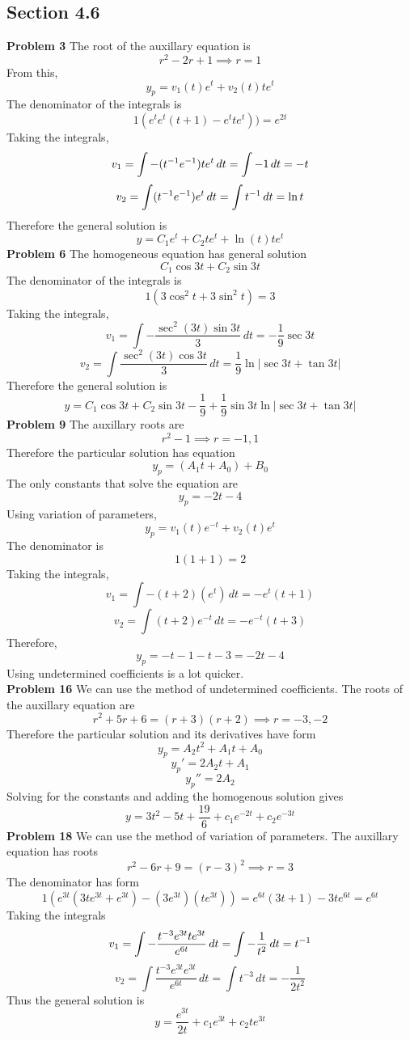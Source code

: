 \subsection*{Section 4.6}
\textbf{Problem 3}
The root of the auxillary equation is 
\[
    r^2-2r+1 \implies r = 1
\]
From this,
\[
    y_p = v_1(t)e^t + v_2(t)te^t
\]
The denominator of the integrals is
\[
    1(e^te^t(t+1) - e^tte^t)) = e^{2t}
\]
Taking the integrals,
\[
    v_1 
    = \int -(t^{-1} e^{-1})te^t \,dt
    = \int -1 \,dt
    = -t
\]
\[
    v_2
    = \int (t^{-1} e^{-1})e^t \,dt
    = \int t^{-1} \,dt
    = \ln t
\]
Therefore the general solution is 
\[
    y = C_1e^t + C_2te^t + \ln (t) te^t
\]
\textbf{Problem 6}
The homogeneous equation has general solution 
\[
    C_1\cos 3t + C_2\sin 3t
\]
The denominator of the integrals is 
\[
    1(3\cos^2t + 3\sin^2t) = 3
\]
Taking the integrals,
\[
    v_1
    = \int -\frac{\sec^2 (3t)\sin 3t}{3} \,dt
    = -\frac{1}{9} \sec 3t
\]
\[
    v_2 
    = \int \frac{\sec^2 (3t)\cos 3t}{3} \,dt
    = \frac{1}{9} \ln |\sec 3t + \tan 3t|
\]
Therefore the general solution is 
\[
    y = C_1\cos 3t + C_2\sin 3t - \frac{1}{9} + \frac{1}{9} \sin 3t \ln |\sec 3t + \tan 3t|
\]
\textbf{Problem 9}
The auxillary roots are 
\[
    r^2 - 1 \implies r = -1, 1
\]
Therefore the particular solution has equation 
\[
    y_p = (A_1t + A_0) + B_0
\]
The only constants that solve the equation are 
\[
    y_p = -2t-4
\]
Using variation of parameters,
\[
    y_p = v_1(t)e^{-t} + v_2(t)e^t
\]
The denominator is
\[
    1(1+1) = 2
\]
Taking the integrals,
\[
    v_1
    = \int -(t+2)(e^t) \,dt
    = -e^t(t+1)
\]
\[
    v_2
    = \int (t+2)e^{-t} \,dt 
    = -e^{-t}(t+3)
\]
Therefore, 
\[
    y_p = -t-1-t-3 = -2t-4
\]
Using undetermined coefficients is a lot quicker. \\
\textbf{Problem 16}
We can use the method of undetermined coefficients.
The roots of the auxillary equation are 
\[
    r^2+5r+6 = (r+3)(r+2) \implies r=-3,-2
\]
Therefore the particular solution and its derivatives have form
\[
    y_p = A_2t^2 + A_1t + A_0
\]
\[
    y_p' = 2A_2t + A_1
\]
\[
    y_p'' = 2A_2
\]
Solving for the constants and adding the homogenous solution gives
\[
    y = 3t^2 - 5t + \frac{19}{6} + c_1e^{-2t} + c_2e^{-3t}
\]
\textbf{Problem 18}
We can use the method of variation of parameters.
The auxillary equation has roots
\[
    r^2-6r+ 9 = (r-3)^2 \implies r = 3
\]
The denominator has form
\[
    1(e^{3t}(3te^{3t} + e^{3t}) - (3e^{3t})(te^{3t}))
    = e^{6t}(3t+1)-3te^{6t}
    = e^{6t}
\]
Taking the integrals 
\[
    v_1
    = \int -\frac{t^{-3}e^{3t}te^{3t}}{e^{6t}} \,dt 
    = \int -\frac{1}{t^2} \,dt
    = t^{-1}
\]
\[
    v_2
    = \int \frac{t^{-3}e^{3t}e^{3t}}{e^{6t}} \,dt 
    = \int t^{-3} \,dt 
    = -\frac{1}{2t^2}
\]
Thus the general solution is 
\[
    y = \frac{e^{3t}}{2t} + c_1e^{3t} + c_2te^{3t}
\]

